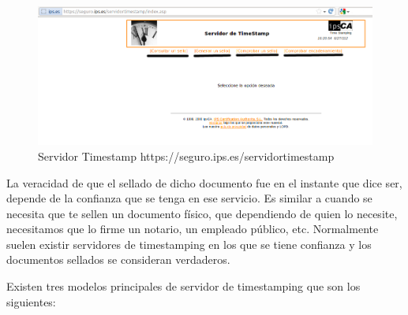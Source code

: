 \begin{figure}[h]
  \centering
    \includegraphics[scale=0.5]{./GoogleAppEngine/imagenes/server_ips_timestamp.png}
  \caption{Servidor Timestamp https://seguro.ips.es/servidortimestamp}
  \label{fig:server_ips_timestamp}
\end{figure}

La veracidad de que el sellado de dicho documento fue en el instante que dice ser, depende de la confianza que se tenga en ese servicio. Es similar a cuando se necesita que te sellen un documento físico, que dependiendo de quien lo necesite, necesitamos que lo firme un notario, un empleado público, etc. Normalmente suelen existir servidores de timestamping en los que se tiene confianza y los documentos sellados se consideran verdaderos.

Existen tres modelos principales de servidor de timestamping que son los siguientes:

